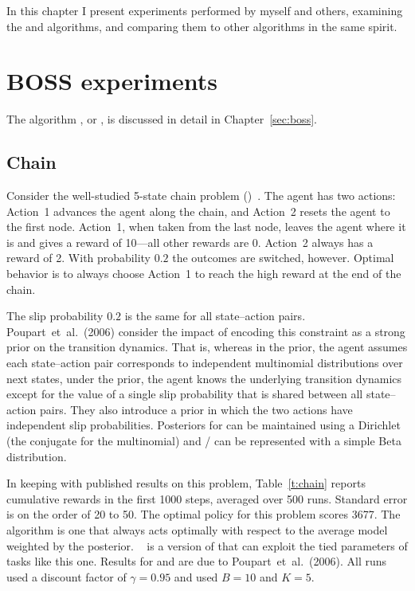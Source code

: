 In this chapter I present experiments performed by myself and others, examining the  and  algorithms, and comparing them to other algorithms in the same spirit.

\section{BOSS experiments}

The algorithm , or , is discussed in detail in Chapter~\ref{sec:boss}.

\subsection{Chain}


Consider the well-studied 5-state chain
problem ()~\cite{strens00,poupart06}.  The agent has two
actions: Action~1 advances the agent along the chain, and Action~2
resets the agent to the first node.  Action~1, when taken from the
last node, leaves the agent where it is and gives a reward of 10---all
other rewards are 0.  Action~2 always has a reward of 2.  With
probability $0.2$ the outcomes are switched, however.  Optimal
behavior is to always choose Action~1 to reach the high reward at the end
of the chain.


The slip probability $0.2$ is the same for all state--action pairs.
Poupart~et~al.~(2006) consider the impact of encoding this constraint
as a strong prior on the transition dynamics.  That is, whereas in the
 prior, the agent assumes each state--action pair corresponds
to independent multinomial distributions over next states, under the
 prior, the agent knows the underlying transition dynamics
except for the value of a single slip probability that is shared
between all state--action pairs.  They also introduce a  prior
in which the two actions have independent slip probabilities.
Posteriors for  can be maintained using a Dirichlet (the conjugate
for the multinomial) and / can be represented with a simple
Beta distribution.

In keeping with published results on this problem, Table~\ref{t:chain}
reports cumulative rewards in the first 1000 steps, averaged over 500
runs.  Standard error is on the order of 20 to 50.  The optimal policy
for this problem scores 3677.  The  algorithm is one that
always acts optimally with respect to the average model weighted by
the posterior.  ~\cite{leffler07} is a version of  that
can exploit the tied parameters of tasks like this one.  Results for
 and  are due to Poupart~et~al.~(2006).  All runs used a
discount factor of $\gamma=0.95$ and  used $B=10$ and $K=5$.

